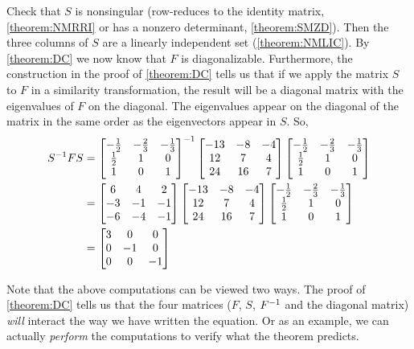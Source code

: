 \documentclass{ximera}
\begin{document}
\begin{example}
Check that $S$ is nonsingular (row-reduces to the identity matrix,
\ref{theorem:NMRRI} or has a nonzero determinant, \ref{theorem:SMZD}).
Then the three columns of $S$ are a linearly independent set
(\ref{theorem:NMLIC}).  By \ref{theorem:DC} we now know that $F$ is
diagonalizable.  Furthermore, the construction in the proof of
\ref{theorem:DC} tells us that if we apply the matrix $S$ to $F$ in a
similarity transformation, the result will be a diagonal matrix with
the eigenvalues of $F$ on the diagonal.  The eigenvalues appear on the
diagonal of the matrix in the same order as the eigenvectors appear in
$S$.  So,
\begin{align*}
\similar{F}{S}&=
\inverse{
\begin{bmatrix}
-\frac{1}{2} & -\frac{2}{3} & -\frac{1}{3}\\
\frac{1}{2} & 1 & 0\\
1 & 0 & 1
\end{bmatrix}
}
\begin{bmatrix}
-13 & -8 & -4\\
12 & 7 & 4\\
24 & 16 & 7
\end{bmatrix}
\begin{bmatrix}
-\frac{1}{2} & -\frac{2}{3} & -\frac{1}{3}\\
\frac{1}{2} & 1 & 0\\
1 & 0 & 1
\end{bmatrix}\\
&=
\begin{bmatrix}
6 & 4 & 2\\
-3 & -1 & -1\\
-6 & -4 & -1
\end{bmatrix}
\begin{bmatrix}
-13 & -8 & -4\\
12 & 7 & 4\\
24 & 16 & 7
\end{bmatrix}
\begin{bmatrix}
-\frac{1}{2} & -\frac{2}{3} & -\frac{1}{3}\\
\frac{1}{2} & 1 & 0\\
1 & 0 & 1
\end{bmatrix}\\
&=
\begin{bmatrix}
3 & 0 & 0\\
0 & -1 & 0\\
0 & 0 & -1
\end{bmatrix}
\end{align*}

Note that the above computations can be viewed two ways.  The proof of
\ref{theorem:DC} tells us that the four matrices ($F$, $S$,
$F^{-1}$ and the diagonal matrix) \textit{will} interact the way
we have written the equation.  Or as an example, we can actually
\textit{perform} the computations to verify what the theorem predicts.
\end{example}
\end{document}
